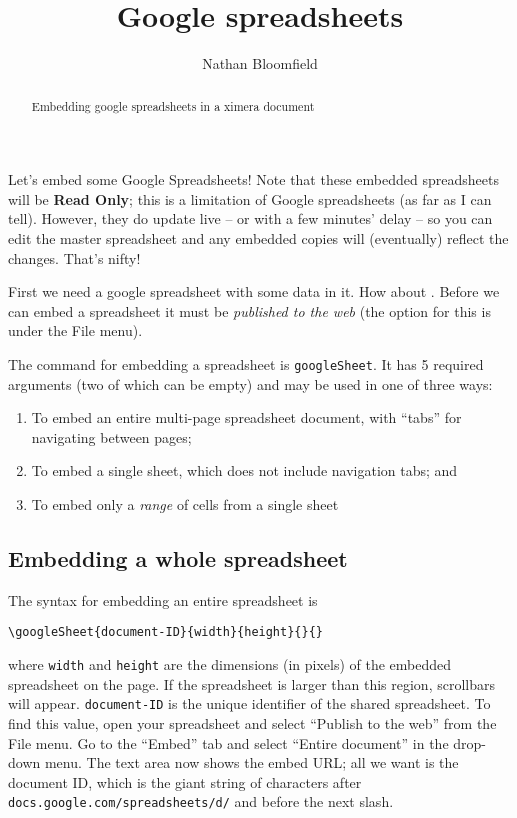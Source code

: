 \documentclass{ximera}
\title{Google spreadsheets}
\author{Nathan Bloomfield}
\begin{document}
\maketitle
 
\begin{abstract}Embedding google spreadsheets in a ximera document
\end{abstract}
 
 
Let's embed some Google Spreadsheets! Note that these embedded spreadsheets will be \textbf{Read Only}; this is a limitation of Google spreadsheets (as far as I can tell). However, they do update live -- or with a few minutes' delay -- so you can edit the master spreadsheet and any embedded copies will (eventually) reflect the changes. That's nifty!
 
First we need a google spreadsheet with some data in it. How about . Before we can embed a spreadsheet it must be \textit{published to the web} (the option for this is under the File menu).
 
The command for embedding a spreadsheet is \texttt{googleSheet}. It has 5 required arguments (two of which can be empty) and may be used in one of three ways:
\begin{enumerate}
\item To embed an entire multi-page spreadsheet document, with ``tabs'' for navigating between pages;
\item To embed a single sheet, which does not include navigation tabs; and
\item To embed only a \textit{range} of cells from a single sheet
\end{enumerate}
 
\subsection{Embedding a whole spreadsheet}
 
The syntax for embedding an entire spreadsheet is
\begin{verbatim}
\googleSheet{document-ID}{width}{height}{}{}
\end{verbatim}
where \texttt{width} and \texttt{height} are the dimensions (in pixels) of the embedded spreadsheet on the page. If the spreadsheet is larger than this region, scrollbars will appear. \texttt{document-ID} is the unique identifier of the shared spreadsheet. To find this value, open your spreadsheet and select ``Publish to the web'' from the File menu. Go to the ``Embed'' tab and select ``Entire document'' in the drop-down menu. The text area now shows the embed URL; all we want is the document ID, which is the giant string of characters after \texttt{docs.google.com/spreadsheets/d/} and before the next slash.
 
\end{document}
